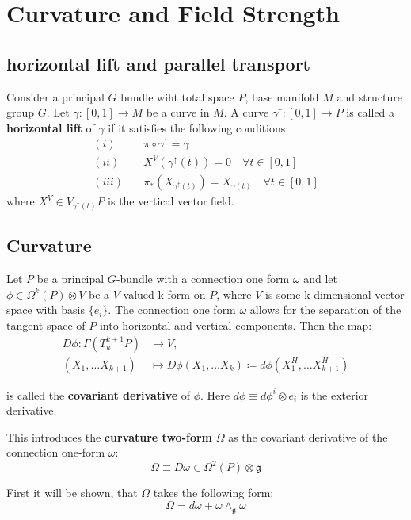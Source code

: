 
\section{Curvature and Field Strength}

\subsection{horizontal lift and parallel transport}

Consider a principal $G$ bundle wiht total space $P$, base manifold $M$ and structure group $G$. Let $\gamma: [0,1] \to M$ be a curve in $M$. A curve $\gamma^\uparrow : [0,1] \to P$ is called a \textbf{horizontal lift} of $\gamma$ if it satisfies the following conditions:
\begin{align*}
  (i) \quad & \pi \circ \gamma^\uparrow = \gamma \\
  (ii) \quad & X^V(\gamma^\uparrow(t)) = 0 \quad \forall t \in [0,1] \\
  (iii) \quad & \pi_*(X_{\gamma^\uparrow(t)}) = X_{\gamma(t)} \quad \forall t \in [0,1]
\end{align*}
where $X^V \in V_{\gamma^\uparrow(t)}P$ is the vertical vector field.


\subsection{Curvature}

Let $P$ be a principal $G$-bundle with a connection one form $\omega$ and let $\phi \in \Omega^k(P) \otimes V$ be a $V$ valued k-form on $P$, where $V$ is some k-dimensional vector space with basis $\{e_i\}$. The connection one form $\omega$ allows for the separation of the tangent space of $P$ into horizontal and vertical components. Then the map:
\begin{align*}
  D\phi : \Gamma(T^{k+1}_uP) & \to V , \\
  (X_1,\dots X_{k+1})& \mapsto D\phi(X_1, \dots X_k) \coloneq d\phi(X^H_1,\dots X^H_{k+1})
\end{align*}

is called the \textbf{covariant derivative} of $\phi$. Here $d\phi \equiv d \phi^i \otimes e_i$ is the exterior derivative.

This introduces the \textbf{curvature two-form} $\Omega$ as the covariant derivative of the connection one-form $\omega$:
\[ \Omega \equiv D\omega \in \Omega^2(P) \otimes \mathfrak{g} \]

First it will be shown, that $\Omega$ takes the following form:
\[ \Omega = d\omega + \omega \wedge_{\mathfrak{g}} \omega \]

